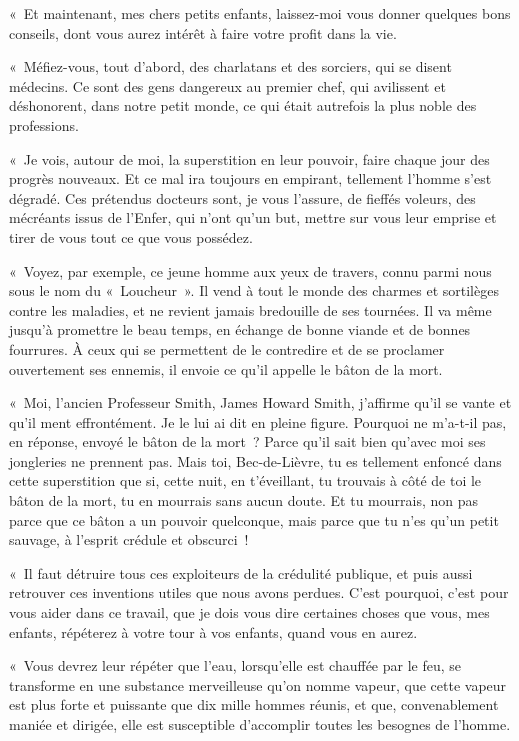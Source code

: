 \documentclass[french,twoside]{book} %
\begin{document}
« Et maintenant, mes chers petits enfants, laissez-moi vous donner quelques bons conseils, dont vous aurez intérêt à faire votre profit dans la vie.\par
« Méfiez-vous, tout d’abord, des charlatans et des sorciers, qui se disent médecins. Ce sont des gens dangereux au premier chef, qui avilissent et déshonorent, dans notre petit monde, ce qui était autrefois la plus noble des professions.\par
« Je vois, autour de moi, la superstition en leur pouvoir, faire chaque jour des progrès nouveaux. Et ce mal ira toujours en empirant, tellement l’homme s’est dégradé. Ces prétendus docteurs sont, je vous l’assure, de fieffés voleurs, des mécréants issus de l’Enfer, qui n’ont qu’un but, mettre sur vous leur emprise et tirer de vous tout ce que vous possédez.\par
« Voyez, par exemple, ce jeune homme aux yeux de travers, connu parmi nous sous le nom du « Loucheur ». Il vend à tout le monde des charmes et sortilèges contre les maladies, et ne revient jamais bredouille de ses tournées. Il va même jusqu’à promettre le beau temps, en échange de bonne viande et de bonnes fourrures. À ceux qui se permettent de le contredire et de se proclamer ouvertement ses ennemis, il envoie ce qu’il appelle le bâton de la mort.\par
« Moi, l’ancien Professeur Smith, James Howard Smith, j’affirme qu’il se vante et qu’il ment effrontément. Je le lui ai dit en pleine figure. Pourquoi ne m’a-t-il pas, en réponse, envoyé le bâton de la mort ? Parce qu’il sait bien qu’avec moi ses jongleries ne prennent pas. Mais toi, Bec-de-Lièvre, tu es tellement enfoncé dans cette superstition que si, cette nuit, en t’éveillant, tu trouvais à côté de toi le bâton de la mort, tu en mourrais sans aucun doute. Et tu mourrais, non pas parce que ce bâton a un pouvoir quelconque, mais parce que tu n’es qu’un petit sauvage, à l’esprit crédule et obscurci !\par
« Il faut détruire tous ces exploiteurs de la crédulité publique, et puis aussi retrouver ces inventions utiles que nous avons perdues. C’est pourquoi, c’est pour vous aider dans ce travail, que je dois vous dire certaines choses que vous, mes enfants, répéterez à votre tour à vos enfants, quand vous en aurez.\par
« Vous devrez leur répéter que l’eau, lorsqu’elle est chauffée par le feu, se transforme en une substance merveilleuse qu’on nomme vapeur, que cette vapeur est plus forte et puissante que dix mille hommes réunis, et que, convenablement maniée et dirigée, elle est susceptible d’accomplir toutes les besognes de l’homme.\par
\end{document}
